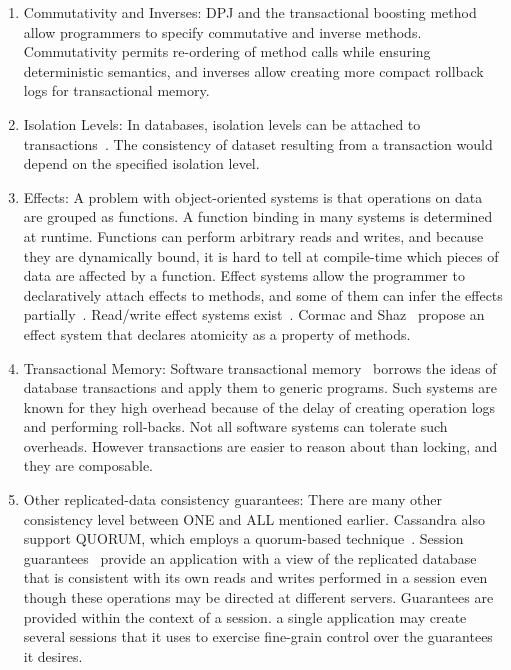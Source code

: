 \documentclass[]{usiinfprospectus}
\begin{document}
\begin{enumerate}
\item Commutativity and Inverses: DPJ and the transactional boosting method~\cite{herlihy2008transactional} allow programmers to specify commutative and inverse methods. Commutativity permits re-ordering of method calls while ensuring deterministic semantics, and inverses allow creating more compact rollback logs for transactional memory. 
	\item Isolation Levels: In databases, isolation levels can be attached to transactions~\cite{bernstein2009sql}. The consistency of dataset resulting from a transaction would depend on the specified isolation level.
	\item Effects: A problem with object-oriented systems is that operations on data are grouped as functions. A function binding in many systems is determined at runtime. Functions can perform arbitrary reads and writes, and because they are dynamically bound, it is hard to tell at compile-time which pieces of data are affected by a function. Effect systems allow the programmer to  declaratively attach effects to methods, and some of them can infer the effects partially~\cite{marino2009generic}. Read/write effect systems exist~\cite{Lucassen:1988:PES:73560.73564}. Cormac and Shaz~\cite{flanagan2003type} propose an effect system that declares atomicity as a property of methods.
	\item Transactional Memory: Software transactional memory~\cite{shavit1997software} borrows the ideas of database transactions and apply them to generic programs. Such systems are known for they high overhead because of the delay of creating operation logs and performing roll-backs. Not all software systems can tolerate such overheads. However transactions are easier to reason about than locking, and they are composable.
	\item Other replicated-data consistency guarantees: There are many other consistency level between ONE and ALL mentioned earlier. Cassandra also support QUORUM, which employs a quorum-based technique~\cite{gifford1979weighted}. Session guarantees~\cite{terry1994session} provide an application with a view of the replicated database that is consistent with its own reads and writes performed in a session even though these operations may be directed at different servers. Guarantees are provided within the context of a session. a single application may create several sessions that it uses to exercise fine-grain control over the guarantees it desires.
\end{enumerate}
\end{document}

